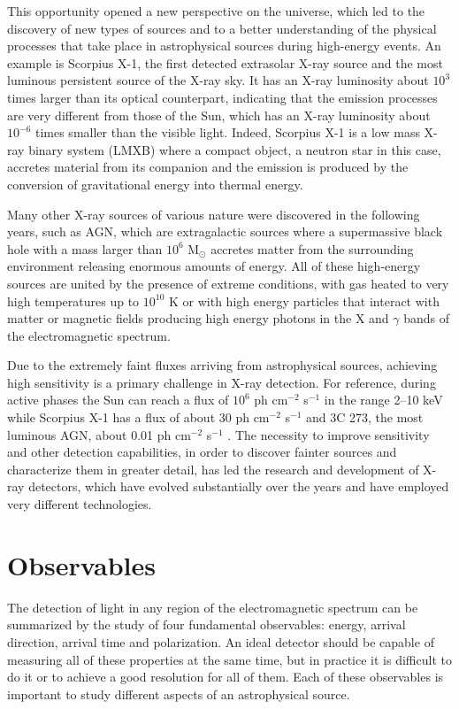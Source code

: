 This opportunity opened a new perspective on the universe, which led to the discovery of new types of sources and to a better understanding of the physical processes that take place in astrophysical sources during high-energy events. An example is Scorpius X-1, the first detected extrasolar X-ray source and the most luminous persistent source of the X-ray sky. It has an X-ray luminosity about $10^3$ times larger than its optical counterpart, indicating that the emission processes are very different from those of the Sun, which has an X-ray luminosity about $10^{-6}$ times smaller than the visible light. Indeed, Scorpius X-1 is a low mass X-ray binary system (LMXB) where a compact object, a neutron star in this case, accretes material from its companion and the emission is produced by the conversion of gravitational energy into thermal energy.

Many other X-ray sources of various nature were discovered in the following years, such as AGN, which are extragalactic sources where a supermassive black hole with a mass larger than $10^6$ M$_{\odot}$ accretes matter from the surrounding environment releasing enormous amounts of energy. All of these high-energy sources are united by the presence of extreme conditions, with gas heated to very high temperatures up to $10^{10}$ K or with high energy particles that interact with matter or magnetic fields producing high energy photons in the X and $\gamma$ bands of the electromagnetic spectrum. 

Due to the extremely faint fluxes arriving from astrophysical sources, achieving high sensitivity is a primary challenge in X-ray detection. For reference, during active phases the Sun can reach a flux of $10^6$ ph cm$^{-2}$ s$^{-1}$ in the range 2--10 keV while Scorpius X-1 has a flux of about 30 ph cm$^{-2}$ s$^{-1}$ and 3C 273, the most luminous AGN, about 0.01 ph cm$^{-2}$ s$^{-1}$ \cite{giacconi2003}. The necessity to improve sensitivity and other detection capabilities, in order to discover fainter sources and characterize them in greater detail, has led the research and development of X-ray detectors, which have evolved substantially over the years and have employed very different technologies.

\section{Observables}

The detection of light in any region of the electromagnetic spectrum can be summarized by the study of four fundamental observables: energy, arrival direction, arrival time and polarization. An ideal detector should be capable of measuring all of these properties at the same time, but in practice it is difficult to do it or to achieve a good resolution for all of them. Each of these observables is important to study different aspects of an astrophysical source. 


